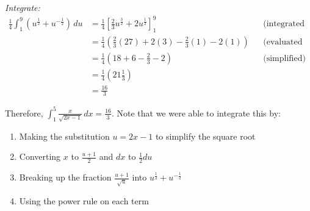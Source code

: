 \documentclass{article}
\begin{document}
\begin{solution}
    \textit{Integrate:}
    \begin{align*}
      \frac{1}{4}\int_1^9 (u^{\frac{1}{2}} + u^{-\frac{1}{2}}) \,du 
      &= \frac{1}{4}\left[\frac{2}{3}u^{\frac{3}{2}} + 2u^{\frac{1}{2}}\right]_1^9 && \text{(integrated each term)} \\
      &= \frac{1}{4}\left(\frac{2}{3}(27) + 2(3) - \frac{2}{3}(1) - 2(1)\right) && \text{(evaluated at bounds)} \\
      &= \frac{1}{4}(18 + 6 - \frac{2}{3} - 2) && \text{(simplified)} \\
      &= \frac{1}{4}(21\frac{1}{3}) \\
      &= \frac{16}{3}
    \end{align*}

    Therefore, $\int_1^5 \frac{x}{\sqrt{2x - 1}} \,dx = \frac{16}{3}$. Note that we were able to integrate this by:
    \begin{enumerate}
      \item Making the substitution $u = 2x - 1$ to simplify the square root
      \item Converting $x$ to $\frac{u+1}{2}$ and $dx$ to $\frac{1}{2}du$
      \item Breaking up the fraction $\frac{u+1}{\sqrt{u}}$ into $u^{\frac{1}{2}} + u^{-\frac{1}{2}}$
      \item Using the power rule on each term
    \end{enumerate}
  \end{solution}
\end{document}
